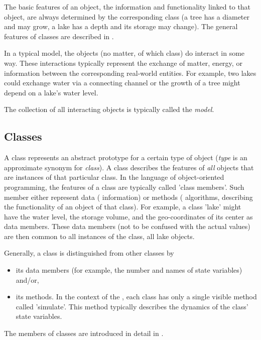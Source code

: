 The basic features of an object, \ie{} the information and functionality linked to that object, are always determined by the corresponding class (a tree has a diameter and may grow, a lake has a depth and its storage may change). The general features of classes are described in .

In a typical model, the objects (no matter, of which class) do interact in some way. These interactions typically represent the exchange of matter, energy, or information between the corresponding real-world entities. For example, two lakes could exchange water via a connecting channel or the growth of a tree might depend on a lake's water level.

The collection of all interacting objects is typically called the \emph{model}.

\subsection{Classes} \label{sec:concept-terms-classes}

A class represents an abstract prototype for a certain type of object (\emph{type} is an approximate synonym for \emph{class}). A class describes the features of \emph{all} objects that are instances of that particular class. In the language of object-oriented programming, the features of a class are typically called 'class members'. Such member either represent data (\ie{} information) or methods (\ie{} algorithms, describing the functionality of an object of that class). For example, a class 'lake' might have the water level, the storage volume, and the geo-coordinates of its center as data members. These data members (not to be confused with the actual values) are then common to all instances of the class, \ie{} all lake objects.

Generally, a class is distinguished from other classes by
\begin{itemize}
  \item its data members (for example, the number and names of state variables) and/or,
  \item its methods. In the context of the , each class has only a single visible method called 'simulate'. This method typically describes the dynamics of the class' state variables.
\end{itemize}

The members of classes are introduced in detail in .

